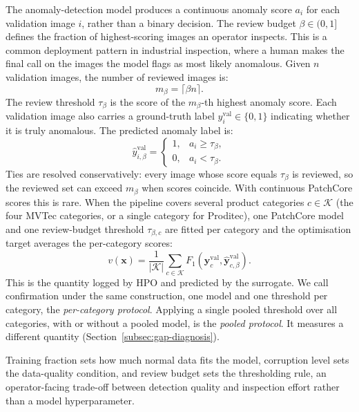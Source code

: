 \documentclass[final,5p,times,twocolumn]{elsarticle}
\begin{document}
The anomaly-detection model produces a continuous anomaly score $a_i$
for each validation image $i$, rather than a binary decision. The
review budget $\beta \in (0,1]$ defines the fraction of highest-scoring
images an operator inspects. This is a common deployment pattern in
industrial inspection, where a human makes the final call on the images
the model flags as most likely anomalous. Given $n$ validation images,
the number of reviewed images is:
\begin{equation}
    m_{\beta} = \lceil \beta n \rceil.
    \label{eq:review-budget-count}
\end{equation}
The review threshold $\tau_{\beta}$ is the score of the
$m_{\beta}$-th highest anomaly score. Each validation image also carries
a ground-truth label $y^{\mathrm{val}}_i \in \{0,1\}$ indicating whether
it is truly anomalous. The predicted anomaly label is:
\begin{equation}
    \hat{y}^{\mathrm{val}}_{i,\beta} =
    \begin{cases}
        1, & a_i \geq \tau_{\beta}, \\
        0, & a_i < \tau_{\beta}.
    \end{cases}
    \label{eq:review-budget-prediction}
\end{equation}
Ties are resolved conservatively: every image whose score equals
$\tau_{\beta}$ is reviewed, so the reviewed set can exceed $m_{\beta}$
when scores coincide. With continuous PatchCore scores this is rare.
When the pipeline covers several product categories $c \in \mathcal{K}$
(the four MVTec categories, or a single category for Proditec), one
PatchCore model and one review-budget threshold $\tau_{\beta,c}$ are
fitted per category and the optimisation target averages the
per-category scores:
\begin{equation}
    v(\mathbf{x}) = \frac{1}{|\mathcal{K}|}\sum_{c \in \mathcal{K}}
    F_1\!\left(\mathbf{y}^{\mathrm{val}}_{c},
               \hat{\mathbf{y}}^{\mathrm{val}}_{c,\beta}\right).
    \label{eq:hpo-target}
\end{equation}
This is the quantity logged by HPO and predicted by the surrogate. We call confirmation under the same construction, one model and one threshold per category, the \emph{per-category protocol}. Applying a single pooled threshold over all categories, with or without a pooled model, is the \emph{pooled protocol}. It measures a different quantity (Section~\ref{subsec:gap-diagnosis}).

Training fraction sets how much normal data fits the model, corruption
level sets the data-quality condition, and review budget sets the
thresholding rule, an operator-facing trade-off between detection
quality and inspection effort rather than a model hyperparameter.
\end{document}
